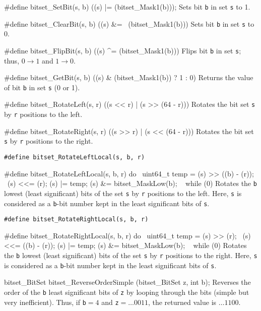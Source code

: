 #define bitset_SetBit(s, b) ((s) |= (bitset_Mask1(b)));
\endcode
 \tab  Sets bit {\tt b} in set  {\tt s}  to 1.
 \endtab
\code

#define bitset_ClearBit(s, b) ((s) &= ~(bitset_Mask1(b)))
\endcode
 \tab  Sets bit {\tt b} in set  {\tt s}  to 0.
 \endtab
\code

#define bitset_FlipBit(s, b) ((s) ^= (bitset_Mask1(b)))
\endcode
 \tab  Flips bit {\tt b} in set {\tt s};  thus,
        $0 \rightarrow 1$ and $1 \rightarrow 0$.
 \endtab
\code

#define bitset_GetBit(s, b)  ((s) & (bitset_Mask1(b)) ? 1 : 0)
\endcode
 \tab  Returns the value of bit {\tt b} in set {\tt s} (0 or 1).
 \endtab
\code

#define bitset_RotateLeft(s, r)  ((s << r) | (s >> (64 - r)))
\endcode
 \tab  Rotates the bit set {\tt s} by {\tt r} positions to the left.
 \endtab
\code

#define bitset_RotateRight(s, r)  ((s >> r) | (s << (64 - r)))
\endcode
 \tab  Rotates the bit set {\tt s} by {\tt r} positions to the right.
\endtab

\noindent
{\tt\#define bitset\_RotateLeftLocal(s, b, r)}

\hide\code
#define bitset_RotateLeftLocal(s, b, r) do { \
   uint64_t temp = (s) >> ((b) - (r)); \
   (s) <<= (r);   (s) |= temp;   (s) &= bitset_MaskLow(b); \
   } while (0)
\endcode\endhide
\tab  Rotates the {\tt b} lowest (least significant) bits of
  the set {\tt s} by {\tt r} positions to the left.
  Here, {\tt s} is considered as a {\tt b}-bit number kept
  in the least significant bits of {\tt s}.
 \endtab

\noindent
{\tt\#define bitset\_RotateRightLocal(s, b, r)}

\hide\code
#define bitset_RotateRightLocal(s, b, r) do { \
   uint64_t temp = (s) >> (r); \
   (s) <<= ((b) - (r));   (s) |= temp;   (s) &= bitset_MaskLow(b); \
   } while (0)
\endcode\endhide
 \tab  Rotates the {\tt b} lowest (least significant) bits of
  the set {\tt s} by {\tt r} positions to the right.
  Here, {\tt s} is considered as a {\tt b}-bit number kept
  in the least significant bits of {\tt s}.
 \endtab


\guisec{Prototypes}
\code

bitset_BitSet bitset_ReverseOrderSimple (bitset_BitSet z, int b);
\endcode
\tab Reverses the order of the {\tt b} least significant bits of {\tt z} by looping
    through the bits (simple but very inefficient). Thus, if {\tt b}${}=4$ and
    {\tt z}${} = \dots 0011$, the returned value is $\dots 1100$.
 \endtab
\code

